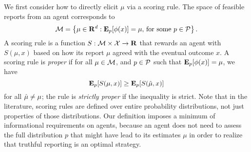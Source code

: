 We first consider how to directly elicit $\mu$ via a scoring rule. 
The space of feasible reports from an agent corresponds to
%
\begin{equation} \label{marginal}
\mathcal{M} = \left\{ \mu \in \mathbf{R}^d : \mathbf{E}_p[\phi(x)] = \mu,\, \mbox{for some $p \in \mathcal{P}$} \right\}.
\end{equation}
%
A scoring rule is a function $S : \mathcal{M} \times \mathcal{X} \rightarrow \mathbf{R}$ that rewards an agent with $S(\mu,x)$ based on how its report $\mu$ agreed with the eventual outcome $x$. A scoring rule is \emph{proper} if for all $\mu \in \mathcal{M}$, and $p \in \mathcal{P}$ such that $\mathbf{E}_p[\phi(x)] = \mu$, we have
%
\begin{equation} \label{scoring}
\mathbf{E}_p[S(\mu,x)] \geq \mathbf{E}_p[S(\hat{\mu},x)]
\end{equation}
%
for all $\hat{\mu} \neq \mu$; the rule is \emph{strictly proper} if the inequality is strict. Note that in the literature, scoring rules are defined over entire probability distributions, not just properties of those distributions. Our definition imposes a minimum of informational requirements on agents, because an agent does not need to assess the full distribution $p$ that might have lead to its estimates $\mu$ in order to realize that truthful reporting is an optimal strategy. 


